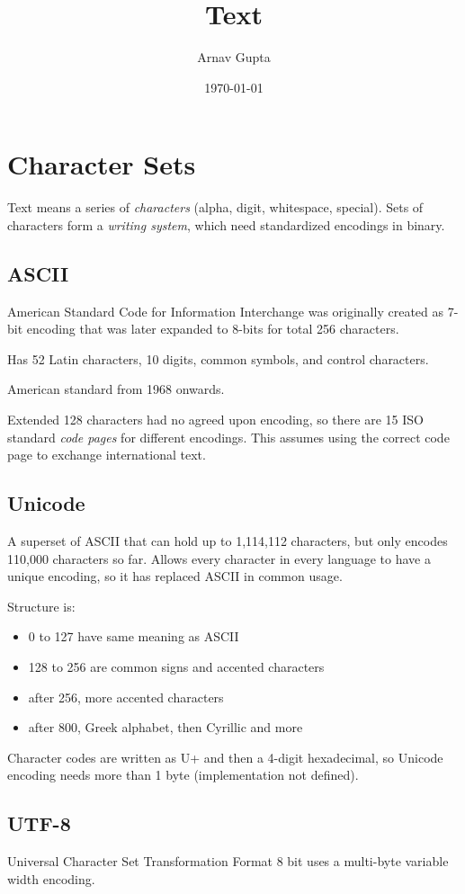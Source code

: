 \documentclass[11pt]{article}
\author{Arnav Gupta}
\date{\today}
\title{Text}
\begin{document}
\maketitle
\tableofcontents

\section{Character Sets}
\label{sec:org83d2e72}
Text means a series of \emph{characters} (alpha, digit, whitespace, special).
Sets of characters form a \emph{writing system}, which need standardized encodings in binary.
\subsection{ASCII}
\label{sec:orgaf6e437}
American Standard Code for Information Interchange
was originally created as 7-bit encoding that was later expanded to 8-bits for total 256 characters.

Has 52 Latin characters, 10 digits, common symbols, and control characters.

American standard from 1968 onwards.

Extended 128 characters had no agreed upon encoding, so there are 15 ISO standard \emph{code pages}
for different encodings. This assumes using the correct code page to exchange international text.
\subsection{Unicode}
\label{sec:org7fbffb3}
A superset of ASCII that can hold up to 1,114,112 characters, but only encodes 110,000 characters
so far.
Allows every character in every language to have a unique encoding, so it has replaced ASCII in
common usage.

Structure is:
\begin{itemize}
\item 0 to 127 have same meaning as ASCII
\item 128 to 256 are common signs and accented characters
\item after 256, more accented characters
\item after 800, Greek alphabet, then Cyrillic and more
\end{itemize}

Character codes are written as U+ and then a 4-digit hexadecimal,
so Unicode encoding needs more than 1 byte (implementation not defined).
\subsection{UTF-8}
\label{sec:orgadddb29}
Universal Character Set Transformation Format 8 bit uses a multi-byte variable width encoding.
\end{document}
